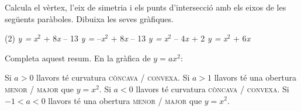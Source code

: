 \begin{mylist}
	

\exer  Calcula el vèrtex, l'eix de simetria i els punts d'intersecció amb els eixos de les següents paràboles. Dibuixa les seves gràfiques.

\begin{tasks}(2)
	\task  \textit{y =} \textit{x}${}^{2}$ + 8\textit{x} -- 13                          
	\task  \textit{y =} --\textit{x}${}^{2}$ + 8\textit{x} -- 13          
	\task  \textit{y =} \textit{x}${}^{2}$ -- 4\textit{x} + 2  
	\task  \textit{y =} \textit{x}${}^{2}$ + 6\textit{x                                  }
\end{tasks}




\exer \spen Completa aquest resum. En la gràfica de $y = ax^{2}$:
\begin{tasks} 
\task Si  $a > 0$ llavors té curvatura \quad \textsc{còncava} / \textsc{convexa}.
%
\task  Si $a > 1$ llavors té una obertura \quad \textsc{menor} / \textsc{major} \quad que $y=x^{2}$.
%
\task Si  $a < 0$ llavors té curvatura \quad \textsc{còncava} / \textsc{convexa}.
%
\task Si $-1<a<0$ llavors té una obertura \quad \textsc{menor} / \textsc{major} \quad que $y=x^{2}$.
\end{tasks}



\end{mylist}
